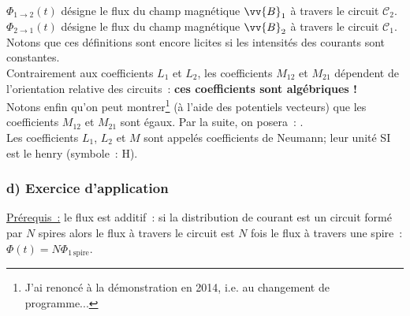 \documentclass{article}
\newcommand{\mathcolorbox}[2]{\fcolorbox{black}{#1}{$#2$}}
\renewcommand\overrightarrow{\vv}
\begin{document}
$\Phi_{\mathrm{1\rightarrow 2}}(t)$ désigne le flux du champ magnétique
$\overrightarrow{B}_{1}$ à travers le circuit $\mathcal{C}_{2}$. \\
$\Phi_{\mathrm{2\rightarrow 1}}(t)$ désigne le flux du champ magnétique
$\overrightarrow{B}_{2}$ à travers le circuit $\mathcal{C}_{1}$. \\
Notons que ces définitions sont encore licites si les intensités des
courants sont constantes. \\
Contrairement aux coefficients $L_{1}$ et $L_{2}$, les coefficients
$M_{\mathrm{12}}$ et $M_{\mathrm{21}}$ dépendent de l'orientation relative des
circuits : \textbf{ces coefficients sont algébriques !} \\
Notons enfin qu'on peut montrer\footnote{J'ai renoncé à la
démonstration en 2014, i.e. au changement de programme...} (à l'aide
des potentiels vecteurs) que les coefficients $M_{\mathrm{12}}$ et $M_{\mathrm{21}}$
sont égaux. Par la suite,
on posera : \mathcolorbox{gray!20}{M_{\mathrm{12}} =M_{\mathrm{21}} =M}. \\
Les coefficients $L_{1}$, $L_{2}$ et $M$ sont appelés coefficients
de Neumann; leur unité SI est le henry (symbole : H).

\subsubsection*{d) Exercice d'application}
\underline{Prérequis :} le flux est additif : si la
distribution de courant est un circuit formé par $N$ spires alors le
flux à travers le circuit est $N$ fois le flux à travers une spire :
$\Phi(t) = N\Phi_{\mathrm{1\,spire}}$.
\end{document}
